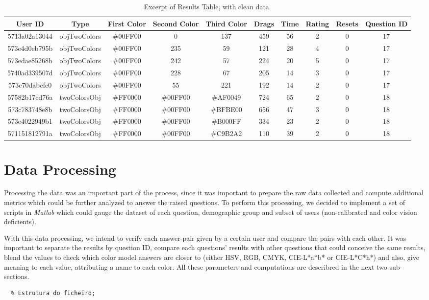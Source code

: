 \begin{table}[htbp]
  \resizebox{\textwidth}{!} {
  \begin{tabular} {|c|c|c|c|c|c|c|c|c|c|}
    \hline
    User ID & Type & First Color & Second Color & Third Color & Drags & Time & Rating & Resets & Question ID \\ \hline
    5713a02a13044 & objTwoColors & \#00FF00 & 0 & 137 & 459 & 56 & 2 & 0 & 17 \\ \hline
    573e4d0eb795b & objTwoColors & \#00FF00 & 235 & 59 & 121 & 28 & 4 & 0 & 17 \\ \hline
    573edae85268b & objTwoColors & \#00FF00 & 242 & 57 & 224 & 20 & 5 & 0 & 17 \\ \hline
    5740ad339507d & objTwoColors & \#00FF00 & 228 & 67 & 205 & 14 & 3 & 0 & 17 \\ \hline
    573c70dabcfe0 & objTwoColors & \#00FF00 & 55 & 221 & 192 & 14 & 2 & 0 & 17 \\ \hline
    57582b17cd76a & twoColorsObj & \#FF0000 & \#00FF00 & \#AF0049 & 724 & 65 & 2 & 0 & 18 \\ \hline
    573c783748e8b & twoColorsObj & \#FF0000 & \#00FF00 & \#BFBE00 & 656 & 47 & 3 & 0 & 18 \\ \hline
    573e4022949b1 & twoColorsObj & \#FF0000 & \#00FF00 & \#B000FF & 334 & 23 & 2 & 0 & 18 \\ \hline
    571151812791a & twoColorsObj & \#FF0000 & \#00FF00 & \#C9B2A2 & 110 & 39 & 2 & 0 & 18 \\
    \hline
  \end{tabular}}
  \caption[Excerpt of Clean "Results" Table]{Excerpt of Results Table, with clean data.}
  \label{table:csv_resultsclean}
\end{table}
%
\section{Data Processing}
\label{sec:results_digest}
%
Processing the data was an important part of the process, since it was important to prepare the raw data collected and compute additional metrics which could be further
analyzed to answer the raised questions. To perform this processing, we decided to implement a set of scripts in \emph{Matlab} which could gauge the dataset of each question,
demographic group and subset of users (non-calibrated and color vision deficients). \par
%
With this data processing, we intend to verify each answer-pair given by a certain user and compare the pairs with each other. It was important to separate the results by question
ID, compare each questions' results with other questions that could conceive the same results, blend the values to check which color model answers are closer to (either HSV, RGB,
CMYK, CIE-L*a*b* or CIE-L*C*h*) and also, give meaning to each value, attributing a name to each color. All these parameters and computations are describred in the next two
sub-sections.
%
\begin{lstlisting}[frame=single]
  % Pseudo-codigo generico;
  % Estrutura do ficheiro;
\end{lstlisting}
%
